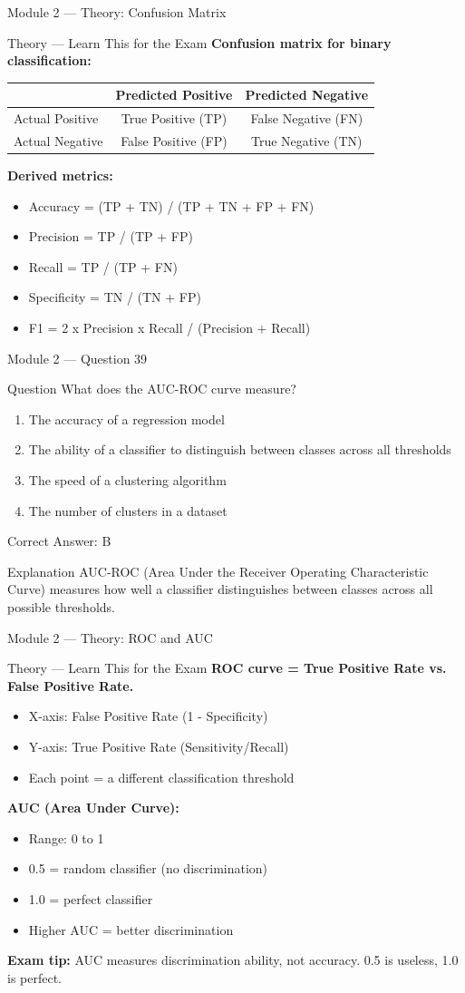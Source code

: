 \documentclass[aspectratio=169,10pt]{beamer}
\newcommand{\question}[1]{%
	\begin{block}{Question}
		#1
	\end{block}
}
\newcommand{\options}[4]{%
	\begin{enumerate}[label=\Alph*.,leftmargin=*]
		\item #1
		\item #2
		\item #3
		\item #4
	\end{enumerate}
}
\newcommand{\answerbox}[1]{%
	\begin{exampleblock}{Correct Answer: #1}
	\end{exampleblock}
}
\newcommand{\explain}[1]{%
	\begin{block}{Explanation}
		\small #1
	\end{block}
}
\newcommand{\theory}[1]{%
	\begin{block}{Theory --- Learn This for the Exam}
		\small #1
	\end{block}
}
\begin{document}
	\begin{frame}{Module 2 --- Theory: Confusion Matrix}
		\theory{
			\textbf{Confusion matrix for binary classification:}
			\begin{center}
				\small
				\begin{tabular}{@{}lcc@{}}
					\toprule
					& Predicted Positive & Predicted Negative \\
					\midrule
					Actual Positive & True Positive (TP) & False Negative (FN) \\
					Actual Negative & False Positive (FP) & True Negative (TN) \\
					\bottomrule
				\end{tabular}
			\end{center}
			\textbf{Derived metrics:}
			\begin{itemize}
				\item Accuracy = (TP + TN) / (TP + TN + FP + FN)
				\item Precision = TP / (TP + FP)
				\item Recall = TP / (TP + FN)
				\item Specificity = TN / (TN + FP)
				\item F1 = 2 x Precision x Recall / (Precision + Recall)
			\end{itemize}
		}
	\end{frame}
	
	\begin{frame}{Module 2 --- Question 39}
		\question{What does the AUC-ROC curve measure?}
		\options{The accuracy of a regression model}{The ability of a classifier to distinguish between classes across all thresholds}{The speed of a clustering algorithm}{The number of clusters in a dataset}
		\answerbox{B}
		\explain{AUC-ROC (Area Under the Receiver Operating Characteristic Curve) measures how well a classifier distinguishes between classes across all possible thresholds.}
	\end{frame}
	
	\begin{frame}{Module 2 --- Theory: ROC and AUC}
		\theory{
			\textbf{ROC curve = True Positive Rate vs. False Positive Rate.}
			\begin{itemize}
				\item X-axis: False Positive Rate (1 - Specificity)
				\item Y-axis: True Positive Rate (Sensitivity/Recall)
				\item Each point = a different classification threshold
			\end{itemize}
			\textbf{AUC (Area Under Curve):}
			\begin{itemize}
				\item Range: 0 to 1
				\item 0.5 = random classifier (no discrimination)
				\item 1.0 = perfect classifier
				\item Higher AUC = better discrimination
			\end{itemize}
			\textbf{Exam tip:} AUC measures discrimination ability, not accuracy. 0.5 is useless, 1.0 is perfect.
		}
	\end{frame}
	
\end{document}
